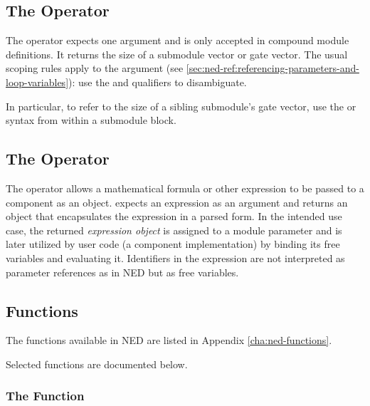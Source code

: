 \subsection{The  Operator}
\label{sec:ned-ref:sizeof-operator}

The  operator expects one argument and is only accepted in
compound module definitions. It returns the size of a submodule vector or gate
vector. The usual scoping rules apply to the argument (see
\ref{sec:ned-ref:referencing-parameters-and-loop-variables}): use the
 and  qualifiers to disambiguate.

In particular, to refer to the size of a sibling submodule's gate vector, use
the  or
 syntax from within a
submodule block.


\subsection{The  Operator}
\label{sec:ned-ref:expr-operator}

The  operator allows a mathematical formula or other expression
to be passed to a component as an object.  expects an
expression as an argument and returns an object that encapsulates the expression
in a parsed form. In the intended use case, the returned \textit{expression
object} is assigned to a module parameter and is later utilized by user code (a
component implementation) by binding its free variables and evaluating it.
Identifiers in the expression are not interpreted as parameter references as in
NED but as free variables.

\subsection{Functions}
\label{sec:ned-ref:functions}

The functions available in NED are listed in Appendix
\ref{cha:ned-functions}.

Selected functions are documented below.

\subsubsection{The  Function}
\label{sec:ned-ref:xmldoc-function}

